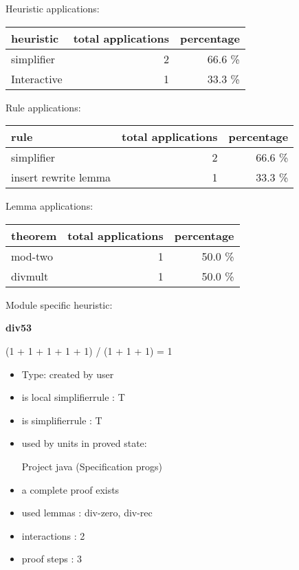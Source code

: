 \documentclass[a4paper]{article}
\begin{document}
\medskip


Heuristic applications:

\begin{supertabular}{l|r|r}
heuristic	& total applications & percentage \\ \hline
simplifier & 2 & 66.6 \% \\
Interactive & 1 & 33.3 \% \\

\end{supertabular}

Rule applications:

\begin{supertabular}{l|r|r}
rule	        & total applications & percentage \\ \hline
simplifier & 2 & 66.6 \% \\
insert rewrite lemma & 1 & 33.3 \% \\

\end{supertabular}

Lemma applications:

\begin{supertabular}{l|r|r}
theorem	        & total applications & percentage \\ \hline
mod-two & 1 & 50.0 \% \\
divmult & 1 & 50.0 \% \\

\end{supertabular}

Module specific heuristic:

\pagebreak

{\LARGE\bf div53}\label{lemma-div53}

\medskip

 \Fol (1 + 1 + 1 + 1 + 1) / (1 + 1 + 1) = 1

\begin{itemize}

\item Type: created by user

\item is local simplifierrule : T
\item is simplifierrule : T
\item used by units in proved state:

Project java (Specification progs)
\item       a complete proof exists
\item       used lemmas  : div-zero, div-rec
\item       interactions : 2
\item       proof steps  : 3
\end{itemize}
\end{document}
